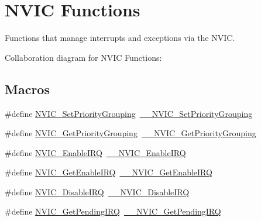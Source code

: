 \hypertarget{group___c_m_s_i_s___core___n_v_i_c_functions}{}\section{N\+V\+IC Functions}
\label{group___c_m_s_i_s___core___n_v_i_c_functions}


Functions that manage interrupts and exceptions via the N\+V\+IC.  


Collaboration diagram for N\+V\+IC Functions\+:
\subsection*{Macros}
\begin{DoxyCompactItemize}
\item 
\#define \hyperlink{group___c_m_s_i_s___core___n_v_i_c_functions_ga0e798d5aec68cdd8263db86a76df788f}{N\+V\+I\+C\+\_\+\+Set\+Priority\+Grouping}~\hyperlink{group___c_m_s_i_s___core___n_v_i_c_functions_gafc94dcbaee03e4746ade1f5bb9aaa56d}{\+\_\+\+\_\+\+N\+V\+I\+C\+\_\+\+Set\+Priority\+Grouping}
\item 
\#define \hyperlink{group___c_m_s_i_s___core___n_v_i_c_functions_ga4eeb9214f2264fc23c34ad5de2d3fa11}{N\+V\+I\+C\+\_\+\+Get\+Priority\+Grouping}~\hyperlink{group___c_m_s_i_s___core___n_v_i_c_functions_ga9b894af672df4373eb637f8288845c05}{\+\_\+\+\_\+\+N\+V\+I\+C\+\_\+\+Get\+Priority\+Grouping}
\item 
\#define \hyperlink{group___c_m_s_i_s___core___n_v_i_c_functions_ga57b3064413dbc7459d9646020fdd8bef}{N\+V\+I\+C\+\_\+\+Enable\+I\+RQ}~\hyperlink{group___c_m_s_i_s___core___n_v_i_c_functions_ga71227e1376cde11eda03fcb62f1b33ea}{\+\_\+\+\_\+\+N\+V\+I\+C\+\_\+\+Enable\+I\+RQ}
\item 
\#define \hyperlink{group___c_m_s_i_s___core___n_v_i_c_functions_ga857de13232ec65dd15087eaa15bc4a69}{N\+V\+I\+C\+\_\+\+Get\+Enable\+I\+RQ}~\hyperlink{group___c_m_s_i_s___core___n_v_i_c_functions_gaaeb5e7cc0eaad4e2817272e7bf742083}{\+\_\+\+\_\+\+N\+V\+I\+C\+\_\+\+Get\+Enable\+I\+RQ}
\item 
\#define \hyperlink{group___c_m_s_i_s___core___n_v_i_c_functions_ga73b4e251f59cab4e9a5e234aac02ae57}{N\+V\+I\+C\+\_\+\+Disable\+I\+RQ}~\hyperlink{group___c_m_s_i_s___core___n_v_i_c_functions_gae016e4c1986312044ee768806537d52f}{\+\_\+\+\_\+\+N\+V\+I\+C\+\_\+\+Disable\+I\+RQ}
\item 
\#define \hyperlink{group___c_m_s_i_s___core___n_v_i_c_functions_gac608957a239466e9e0cbc30aa64feb3b}{N\+V\+I\+C\+\_\+\+Get\+Pending\+I\+RQ}~\hyperlink{group___c_m_s_i_s___core___n_v_i_c_functions_ga5a92ca5fa801ad7adb92be7257ab9694}{\+\_\+\+\_\+\+N\+V\+I\+C\+\_\+\+Get\+Pending\+I\+RQ}

\end{DoxyCompactItemize}
